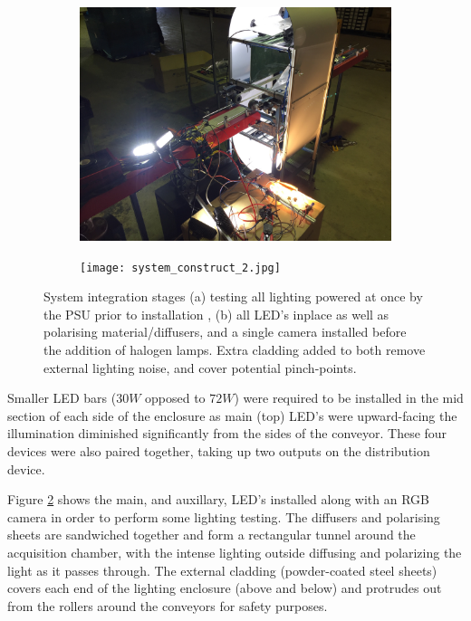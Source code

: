 \documentclass[fleqn,twoside]{article}
\begin{document}
\begin{figure}[ht!]
	\centering
	\begin{subfigure}{.5\textwidth}
		\centering
		\includegraphics[width=.9\linewidth]{system_construct_1.JPG}
		\caption{}
		\label{fig:system_construct_1}
	\end{subfigure}%
	\begin{subfigure}{.5\textwidth}
		\centering
		\texttt{[image: system\_construct\_2.jpg]}
		\caption{}
		\label{fig:system_construct_2}
	\end{subfigure}%
	\caption{System integration stages (a) testing all lighting powered at once by the PSU prior to installation , (b) all LED's inplace as well as polarising material/diffusers, and a single camera installed before the addition of halogen lamps. Extra cladding added to both remove external lighting noise, and cover potential pinch-points.}
	\label{}
\end{figure}

Smaller LED bars ($30W$ opposed to $72W$) were required to be installed in the mid section of each side of the enclosure as main (top) LED's were upward-facing the illumination diminished significantly from the sides of the conveyor. These four devices were also paired together, taking up two outputs on the distribution device. 


Figure \ref{fig:system_construct_2} shows the main, and auxillary, LED's installed along with an RGB camera in order to perform some lighting testing. The diffusers and polarising sheets are sandwiched together and form a rectangular tunnel around the acquisition chamber, with the intense lighting outside diffusing and polarizing the light as it passes through. The external cladding (powder-coated steel sheets) covers each end of the lighting enclosure (above and below) and protrudes out from the rollers around the conveyors for safety purposes. 
\end{document}
